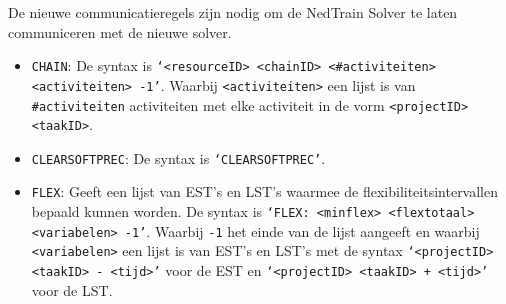 De nieuwe communicatieregels zijn nodig om de NedTrain Solver te laten communiceren met de nieuwe solver.
\begin{itemize}
    \item \texttt{CHAIN}: De syntax is \texttt{\textquoteleft <resourceID> <chainID> <\#activiteiten> <activiteiten> -1\textquoteright}. Waarbij \texttt{<activiteiten>} een lijst is van \texttt{\#activiteiten} activiteiten met elke activiteit in de vorm \texttt{<projectID> <taakID>}.
    \item \texttt{CLEARSOFTPREC}: De syntax is \texttt{\textquoteleft CLEARSOFTPREC\textquoteright}.
    \item \texttt{FLEX}: Geeft een lijst van EST's en LST's waarmee de flexibiliteitsintervallen bepaald kunnen worden. De syntax is \texttt{\textquoteleft FLEX: <minflex> <flextotaal> <variabelen> -1\textquoteright}. Waarbij \texttt{-1} het einde van de lijst aangeeft en waarbij \texttt{<variabelen>} een lijst is van EST's en LST's met de syntax \texttt{\textquoteleft <projectID> <taakID> - <tijd>\textquoteright} voor de EST en \texttt{\textquoteleft <projectID> <taakID> + <tijd>\textquoteright} voor de LST.
\end{itemize}
